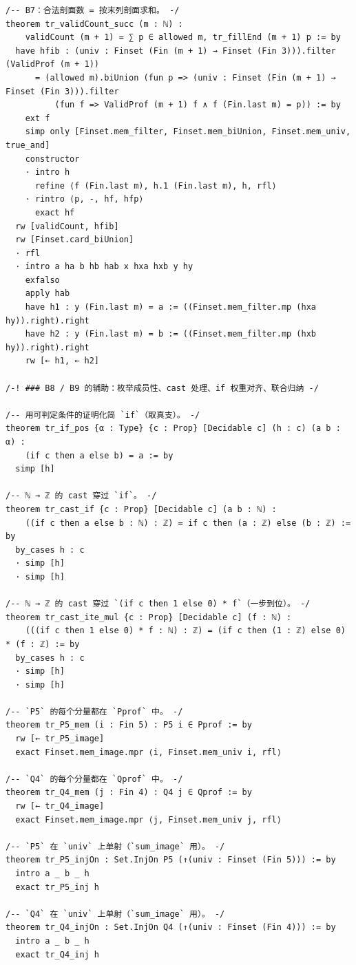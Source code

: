 \documentclass[11pt]{article}
\begin{document}
\begin{lstlisting}
/-- B7：合法剖面数 = 按末列剖面求和。 -/
theorem tr_validCount_succ (m : ℕ) :
    validCount (m + 1) = ∑ p ∈ allowed m, tr_fillEnd (m + 1) p := by
  have hfib : (univ : Finset (Fin (m + 1) → Finset (Fin 3))).filter (ValidProf (m + 1))
      = (allowed m).biUnion (fun p => (univ : Finset (Fin (m + 1) → Finset (Fin 3))).filter
          (fun f => ValidProf (m + 1) f ∧ f (Fin.last m) = p)) := by
    ext f
    simp only [Finset.mem_filter, Finset.mem_biUnion, Finset.mem_univ, true_and]
    constructor
    · intro h
      refine ⟨f (Fin.last m), h.1 (Fin.last m), h, rfl⟩
    · rintro ⟨p, -, hf, hfp⟩
      exact hf
  rw [validCount, hfib]
  rw [Finset.card_biUnion]
  · rfl
  · intro a ha b hb hab x hxa hxb y hy
    exfalso
    apply hab
    have h1 : y (Fin.last m) = a := ((Finset.mem_filter.mp (hxa hy)).right).right
    have h2 : y (Fin.last m) = b := ((Finset.mem_filter.mp (hxb hy)).right).right
    rw [← h1, ← h2]

/-! ### B8 / B9 的辅助：枚举成员性、cast 处理、if 权重对齐、联合归纳 -/

/-- 用可判定条件的证明化简 `if`（取真支）。 -/
theorem tr_if_pos {α : Type} {c : Prop} [Decidable c] (h : c) (a b : α) :
    (if c then a else b) = a := by
  simp [h]

/-- ℕ → ℤ 的 cast 穿过 `if`。 -/
theorem tr_cast_if {c : Prop} [Decidable c] (a b : ℕ) :
    ((if c then a else b : ℕ) : ℤ) = if c then (a : ℤ) else (b : ℤ) := by
  by_cases h : c
  · simp [h]
  · simp [h]

/-- ℕ → ℤ 的 cast 穿过 `(if c then 1 else 0) * f`（一步到位）。 -/
theorem tr_cast_ite_mul {c : Prop} [Decidable c] (f : ℕ) :
    (((if c then 1 else 0) * f : ℕ) : ℤ) = (if c then (1 : ℤ) else 0) * (f : ℤ) := by
  by_cases h : c
  · simp [h]
  · simp [h]

/-- `P5` 的每个分量都在 `Pprof` 中。 -/
theorem tr_P5_mem (i : Fin 5) : P5 i ∈ Pprof := by
  rw [← tr_P5_image]
  exact Finset.mem_image.mpr ⟨i, Finset.mem_univ i, rfl⟩

/-- `Q4` 的每个分量都在 `Qprof` 中。 -/
theorem tr_Q4_mem (j : Fin 4) : Q4 j ∈ Qprof := by
  rw [← tr_Q4_image]
  exact Finset.mem_image.mpr ⟨j, Finset.mem_univ j, rfl⟩

/-- `P5` 在 `univ` 上单射（`sum_image` 用）。 -/
theorem tr_P5_injOn : Set.InjOn P5 (↑(univ : Finset (Fin 5))) := by
  intro a _ b _ h
  exact tr_P5_inj h

/-- `Q4` 在 `univ` 上单射（`sum_image` 用）。 -/
theorem tr_Q4_injOn : Set.InjOn Q4 (↑(univ : Finset (Fin 4))) := by
  intro a _ b _ h
  exact tr_Q4_inj h


\end{lstlisting}
\end{document}
